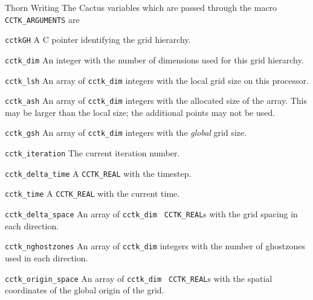 \begin{cactuspart}{Thorn Writing}
The Cactus variables which are passed through the macro
\texttt{CCTK\_ARGUMENTS} are
\begin{Lentry}
\item [\texttt{cctkGH}] A C pointer identifying the grid hierarchy.
\item [\texttt{cctk\_dim}] An integer with the number of dimensions
      used for this grid hierarchy.
\item [\texttt{cctk\_lsh}] An array of \texttt{cctk\_dim} integers
      with the local grid size on this processor.
\item [\texttt{cctk\_ash}] An array of \texttt{cctk\_dim} integers
      with the allocated size of the array.  This may be larger than
      the local size; the additional points may not be used.
\item [\texttt{cctk\_gsh}] An array of \texttt{cctk\_dim} integers
      with the \textit{global} grid size.
\item [\texttt{cctk\_iteration}] The current iteration number.
\item [\texttt{cctk\_delta\_time}] A \texttt{CCTK\_REAL} with the timestep.
\item [\texttt{cctk\_time}] A \texttt{CCTK\_REAL} with the current time.
\item [\texttt{cctk\_delta\_space}] An array of \texttt{cctk\_dim} {\tt
CCTK\_REAL}s with the grid spacing in each direction.
\item [\texttt{cctk\_nghostzones}] An array of \texttt{cctk\_dim} integers with
         the number of ghostzones used in each direction.
\item [\texttt{cctk\_origin\_space}] An array of \texttt{cctk\_dim} {\tt
      CCTK\_REAL}s with the spatial coordinates of the global origin
      of the grid.

\end{Lentry}


\end{cactuspart}
